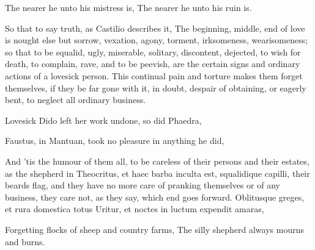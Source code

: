 {The nearer he unto his mistress is,
The nearer he unto his ruin is.

So that to say truth, as Castilio describes it, The beginning,
middle, end of love is nought else but sorrow, vexation, agony,
torment, irksomeness, wearisomeness; so that to be squalid, ugly,
miserable, solitary, discontent, dejected, to wish for death, to
complain, rave, and to be peevish, are the certain signs and ordinary
actions of a lovesick person. This continual pain and torture makes
them forget themselves, if they be far gone with it, in doubt, despair
of obtaining, or eagerly bent, to neglect all ordinary business.

Lovesick Dido left her work undone, so did Phaedra,

Faustus, in Mantuan, took no pleasure in anything he did,

And 'tis the humour of them all, to be careless of their persons and
their estates, as the shepherd in Theocritus, et haec barba
inculta est, squalidique capilli, their beards flag, and they have no
more care of pranking themselves or of any business, they care not, as
they say, which end goes forward.
Oblitusque greges, et rura domestica totus
Uritur, et noctes in luctum expendit amaras,

Forgetting flocks of sheep and country farms,
The silly shepherd always mourns and burns.

}
